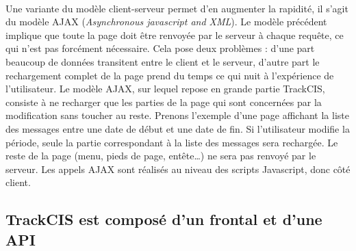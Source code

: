 			\paragraph{}%
			Une variante du modèle client-serveur permet d'en augmenter la rapidité, il
			s'agit du modèle AJAX (\textit{Asynchronous javascript and XML}).
			Le modèle précédent implique que toute la page doit être renvoyée par le
			serveur à chaque requête, ce qui n'est pas forcément nécessaire. Cela pose
			deux problèmes :
			d'une part beaucoup de données transitent entre le client et le serveur,
			d'autre part le rechargement complet de la page prend du temps ce qui nuit à
			l'expérience de l'utilisateur.
			Le modèle AJAX, sur lequel repose en grande partie TrackCIS, consiste à ne
			recharger que les parties de la page qui sont concernées par la modification
			sans toucher au reste.
			Prenons l'exemple d'une page affichant la liste des messages entre
			une date de début et une date de fin. Si l'utilisateur modifie la période,
			seule la partie correspondant à la liste des messages sera rechargée. Le
			reste de la page (menu, pieds de page, entête\ldots) ne sera pas renvoyé par
			le serveur. Les appels AJAX sont réalisés au niveau des scripts Javascript,
			donc côté client.
			
		\subsection{TrackCIS est composé d'un frontal et d'une API}
